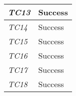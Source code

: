 \begin{minipage}{\linewidth}
\begin{tabular}{ |l|p{70mm}| }
	\it{\cellcolor{gray!25}TC13} & Success \\ \hline
	\it{\cellcolor{gray!25}TC14} & Success \\ \hline
	\it{\cellcolor{gray!25}TC15} & Success \\ \hline
	\it{\cellcolor{gray!25}TC16} & Success \\ \hline
	\it{\cellcolor{gray!25}TC17} & Success \\ \hline
	\it{\cellcolor{gray!25}TC18} & Success \\ \hline
	\hline
\end{tabular}
\medskip
\end{minipage}

